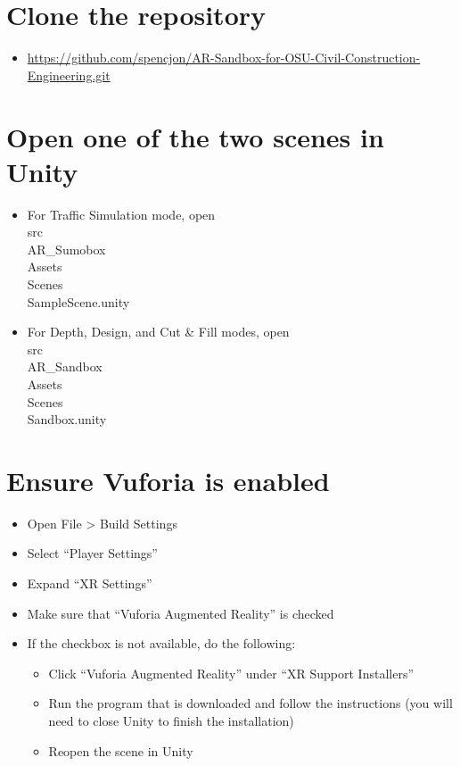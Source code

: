 \documentclass{article}
\begin{document}
\section{Clone the repository}
    \begin{itemize}
        \item  \url{https://github.com/spencjon/AR-Sandbox-for-OSU-Civil-Construction-Engineering.git}
    \end{itemize}

\section{Open one of the two scenes in Unity}
\begin{itemize}
    \item For Traffic Simulation mode, open \\src\\AR\_Sumobox\\Assets\\Scenes\\SampleScene.unity
    \item For Depth, Design, and Cut \& Fill modes, open \\src\\AR\_Sandbox\\Assets\\Scenes\\Sandbox.unity
\end{itemize}

\section{Ensure Vuforia is enabled}
\begin{itemize}
    \item Open File > Build Settings
    \item Select “Player Settings”
    \item Expand “XR Settings”
    \item Make sure that “Vuforia Augmented Reality” is checked
    \item If the checkbox is not available, do the following:
        \begin{itemize}
            \item Click “Vuforia Augmented Reality” under “XR Support Installers”
            \item Run the program that is downloaded and follow the instructions (you will need to close Unity to finish the installation)
            \item Reopen the scene in Unity
        \end{itemize}
\end{itemize}
\end{document}
